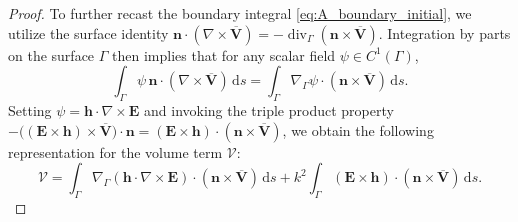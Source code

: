 \documentclass[12pt,reqno]{amsart}
\theoremstyle{definition}
\numberwithin{equation}{section}
\begin{document}
\begin{proof}
To further recast the boundary integral \eqref{eq:A_boundary_initial}, we utilize the surface identity $\mathbf{n} \cdot (\nabla \times \overline{\mathbf{V}}) = -\operatorname{div}_\Gamma(\mathbf{n} \times \overline{\mathbf{V}})$. Integration by parts on the surface $\Gamma$ then implies that for any scalar field $\psi \in C^1(\Gamma)$, 
\[
\int_\Gamma \psi \, \mathbf{n} \cdot (\nabla \times \overline{\mathbf{V}}) \, \mathrm{d}s = \int_\Gamma \nabla_\Gamma \psi \cdot (\mathbf{n} \times \overline{\mathbf{V}}) \, \mathrm{d}s.
\]
Setting $\psi = \mathbf{h} \cdot \nabla \times \mathbf{E}$ and invoking the triple product property $-\bigl( (\mathbf{E} \times \mathbf{h}) \times \overline{\mathbf{V}} \bigr) \cdot \mathbf{n} = (\mathbf{E} \times \mathbf{h}) \cdot (\mathbf{n} \times \overline{\mathbf{V}})$, we obtain the following representation for the volume term $\mathscr V$:
\begin{equation}
\label{eq:A_final}
\mathscr V = \int_\Gamma \nabla_\Gamma (\mathbf{h} \cdot \nabla \times \mathbf{E}) \cdot (\mathbf{n} \times \overline{\mathbf{V}}) \, \mathrm{d}s + k^2 \int_\Gamma (\mathbf{E} \times \mathbf{h}) \cdot (\mathbf{n} \times \overline{\mathbf{V}}) \, \mathrm{d}s.
\end{equation}


\end{proof}
\end{document}
